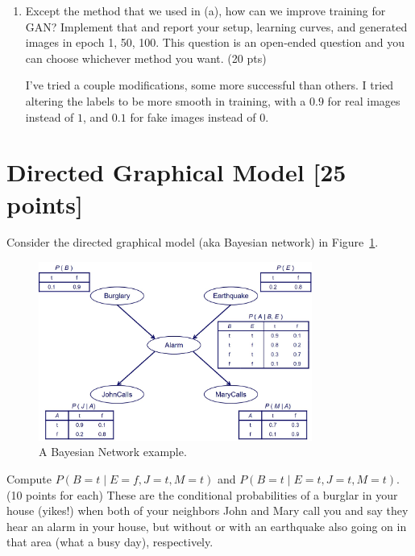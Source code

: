 \documentclass[a4paper]{article}
\theoremstyle{definition}
\newenvironment{soln}{
	\leavevmode\color{blue}\ignorespaces
}{}
\begin{document}
\begin{enumerate} [label=(\alph*)]
		\item Except the method that we used in (a), how can we improve training for GAN? Implement that and report your setup, learning curves, and generated images in epoch 1, 50, 100.
        This question is an open-ended question and you can choose whichever method you want.
		\hfill (20 pts)
		
		\begin{soln}
			I've tried a couple modifications, some more successful than others. I tried altering the labels to be more smooth in training, with a $0.9$ for real images instead of $1$, and $0.1$ for fake images instead of $0$.
		\end{soln}
		
	\end{enumerate}

\section{Directed Graphical Model [25 points]}
Consider the directed graphical model (aka Bayesian network) in Figure~\ref{fig:bn}.
\begin{figure}[H]
    \centering
    \includegraphics[width=0.8\textwidth]{BN.jpeg}
    \caption{A Bayesian Network example.}
    \label{fig:bn}
\end{figure}
Compute $P(B=t \mid E=f,J=t,M=t)$ and $P(B=t \mid E=t,J=t,M=t)$. (10 points for each) These are the conditional probabilities of a burglar in your house (yikes!) when both of your neighbors John and Mary call you and say they hear an alarm in your house, but without or with an earthquake also going on in that area (what a busy day), respectively.
\end{document}
